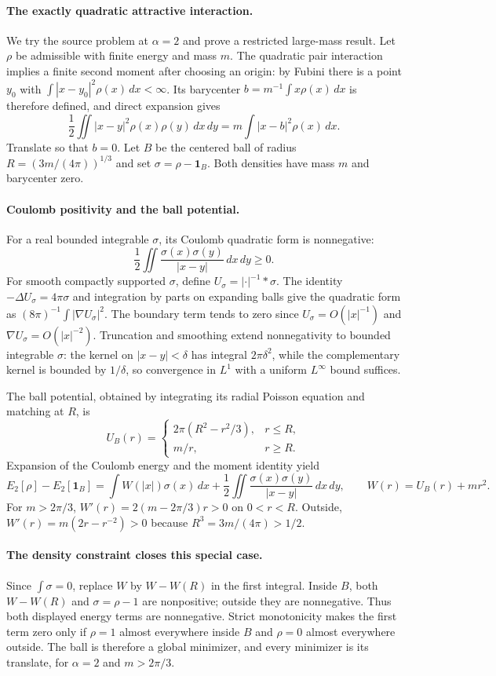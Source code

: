 \documentclass[11pt]{article}
\begin{document}
\paragraph{The exactly quadratic attractive interaction.}
We try the source problem at $\alpha=2$ and prove a restricted large-mass result. Let $\rho$ be admissible with finite energy and mass $m$. The quadratic pair interaction implies a finite second moment after choosing an origin: by Fubini there is a point $y_0$ with $\int|x-y_0|^2\rho(x)\,dx<\infty$. Its barycenter $b=m^{-1}\int x\rho(x)\,dx$ is therefore defined, and direct expansion gives
\[
 \frac12\iint|x-y|^2\rho(x)\rho(y)\,dx\,dy
 =m\int|x-b|^2\rho(x)\,dx.
\]
Translate so that $b=0$. Let $B$ be the centered ball of radius $R=(3m/(4\pi))^{1/3}$ and set $\sigma=\rho-\mathbf1_B$. Both densities have mass $m$ and barycenter zero.

\paragraph{Coulomb positivity and the ball potential.}
For a real bounded integrable $\sigma$, its Coulomb quadratic form is nonnegative:
\[
 \frac12\iint\frac{\sigma(x)\sigma(y)}{|x-y|}\,dx\,dy\geq0.
\]
For smooth compactly supported $\sigma$, define $U_\sigma=|\cdot|^{-1}*\sigma$. The identity $-\Delta U_\sigma=4\pi\sigma$ and integration by parts on expanding balls give the quadratic form as $(8\pi)^{-1}\int|\nabla U_\sigma|^2$. The boundary term tends to zero since $U_\sigma=O(|x|^{-1})$ and $\nabla U_\sigma=O(|x|^{-2})$. Truncation and smoothing extend nonnegativity to bounded integrable $\sigma$: the kernel on $|x-y|<\delta$ has integral $2\pi\delta^2$, while the complementary kernel is bounded by $1/\delta$, so convergence in $L^1$ with a uniform $L^\infty$ bound suffices.

The ball potential, obtained by integrating its radial Poisson equation and matching at $R$, is
\[
 U_B(r)=\begin{cases}2\pi(R^2-r^2/3),&r\leq R,\\m/r,&r\geq R.\end{cases}
\]
Expansion of the Coulomb energy and the moment identity yield
\[
 E_2[\rho]-E_2[\mathbf1_B]
 =\int W(|x|)\sigma(x)\,dx
   +\frac12\iint\frac{\sigma(x)\sigma(y)}{|x-y|}\,dx\,dy,
 \qquad W(r)=U_B(r)+mr^2.
\]
For $m>2\pi/3$, $W'(r)=2(m-2\pi/3)r>0$ on $0<r<R$. Outside, $W'(r)=m(2r-r^{-2})>0$ because $R^3=3m/(4\pi)>1/2$.

\paragraph{The density constraint closes this special case.}
Since $\int\sigma=0$, replace $W$ by $W-W(R)$ in the first integral. Inside $B$, both $W-W(R)$ and $\sigma=\rho-1$ are nonpositive; outside they are nonnegative. Thus both displayed energy terms are nonnegative. Strict monotonicity makes the first term zero only if $\rho=1$ almost everywhere inside $B$ and $\rho=0$ almost everywhere outside. The ball is therefore a global minimizer, and every minimizer is its translate, for $\alpha=2$ and $m>2\pi/3$.
\end{document}
